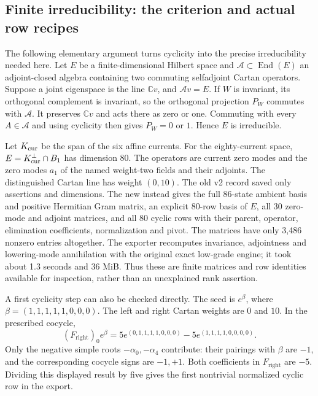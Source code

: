 \subsection{Finite irreducibility: the criterion and actual row recipes}

The following elementary argument turns cyclicity into the precise
irreducibility needed here. Let $E$ be a finite-dimensional Hilbert
space and $\mathcal A\subset\operatorname{End}(E)$ an adjoint-closed
algebra containing two commuting selfadjoint Cartan operators.
Suppose a joint eigenspace is the line $\mathbb Cv$, and
$\mathcal Av=E$. If $W$ is invariant, its orthogonal complement
is invariant, so the orthogonal projection $P_W$ commutes with
$\mathcal A$. It preserves $\mathbb Cv$ and acts there as zero
or one. Commuting with every $A\in\mathcal A$ and using cyclicity
then gives $P_W=0$ or $1$. Hence $E$ is irreducible.

Let $K_{\rm cur}$ be the span of the six affine currents.
For the eighty-current space, $E=K_{\rm cur}^\perp\cap B_1$ has
dimension 80. The operators are current zero modes and the zero modes $a_1$
of the named weight-two fields and their adjoints. The distinguished
Cartan line has weight $(0,10)$. The old v2 record saved only
assertions and dimensions. The new
 instead gives the full 86-state
ambient basis and positive Hermitian Gram matrix, an explicit
80-row basis of $E$, all 30 zero-mode and adjoint matrices,
and all 80 cyclic rows with their parent, operator, elimination
coefficients, normalization and pivot. The matrices have only
3,486 nonzero entries altogether. The exporter recomputes
invariance, adjointness and lowering-mode annihilation with the
original exact low-grade engine; it took about 1.3 seconds and
36 MiB. Thus these are finite matrices and row identities available
for inspection, rather than an unexplained rank assertion.

A first cyclicity step can also be checked directly. The seed is
$e^\beta$, where $\beta=(1,1,1,1,1,0,0,0)$. The left and right
Cartan weights are $0$ and $10$. In the prescribed cocycle,
\[
 (F_\mathrm{right})_0e^\beta
 =5e^{(0,1,1,1,1,0,0,0)}
  -5e^{(1,1,1,1,0,0,0,0)}.
\]
Only the negative simple roots $-\alpha_0,-\alpha_4$ contribute:
their pairings with $\beta$ are $-1$, and the corresponding
cocycle signs are $-1,+1$. Both coefficients in $F_\mathrm{right}$
are $-5$. Dividing this displayed result by five gives the first
nontrivial normalized cyclic row in the export.

